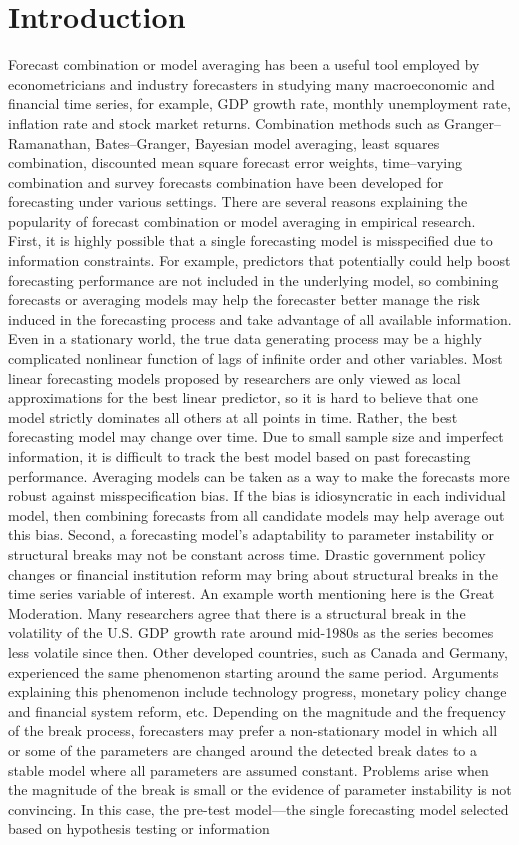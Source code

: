 \section{Introduction}
Forecast combination or model averaging has been a useful tool employed by econometricians and industry forecasters in studying many macroeconomic and financial time series, for example, GDP growth rate, monthly unemployment rate, inflation rate and stock market returns. Combination methods such as Granger--Ramanathan, Bates--Granger, Bayesian model averaging, least squares combination, discounted mean square forecast error weights, time--varying combination and survey forecasts combination have been developed for forecasting under various settings. There are several reasons explaining the popularity of forecast combination or model averaging in empirical research. First, it is highly possible that a single forecasting model is misspecified due to information constraints. For example, predictors that potentially could help boost forecasting performance are not included in the underlying model, so combining forecasts or averaging models may help the forecaster better manage the risk induced in the forecasting process and take advantage of all available information. Even in a stationary world, the true data generating process may be a highly complicated nonlinear function of lags of infinite order and other variables. Most linear forecasting models proposed by researchers are only viewed as local approximations for the best linear predictor, so it is hard to believe that one model strictly dominates all others at all points in time. Rather, the best forecasting model may change over time. Due to small sample size and imperfect information, it is difficult to track the best model based on past forecasting performance. Averaging models can be taken as a way to make the forecasts more robust against misspecification bias. If the bias is idiosyncratic in each individual model, then combining forecasts from all candidate models may help average out this bias. Second, a forecasting model's adaptability to parameter instability or structural breaks may not be constant across time. Drastic government policy changes or financial institution reform may bring about structural breaks in the time series variable of interest. An example worth mentioning here is the Great Moderation. Many researchers agree that there is a structural break in the volatility of the U.S. GDP growth rate around mid-1980s as the series becomes less volatile since then. Other developed countries, such as Canada and Germany, experienced the same phenomenon starting around the same period. Arguments explaining this phenomenon include technology progress, monetary policy change and financial system reform, etc. Depending on the magnitude and the frequency of the break process, forecasters may prefer a non-stationary model in which all or some of the parameters are changed around the detected break dates to a stable model where all parameters are assumed constant. Problems arise when the magnitude of the break is small or the evidence of parameter instability is not convincing. In this case, the pre-test model---the single forecasting model selected based on hypothesis testing or information 